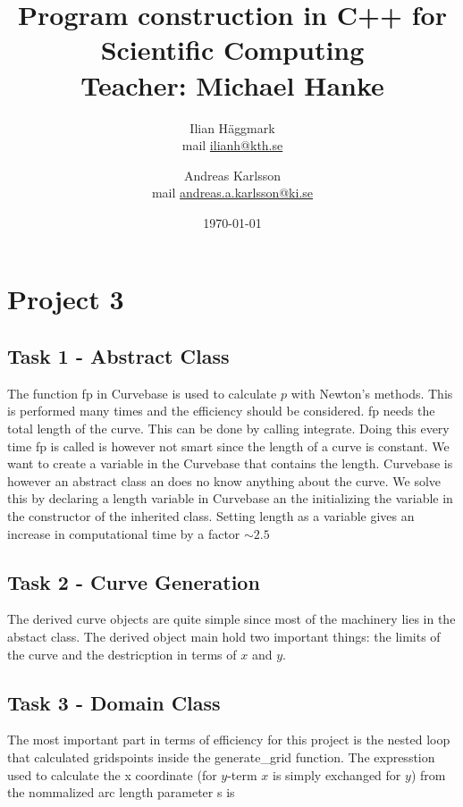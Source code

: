 \documentclass[paper=a4, fontsize=12pt]{article} %
\title{Program construction in C++ for Scientific Computing \\ Teacher: Michael Hanke}
\author{Ilian H{\"a}ggmark \\ mail \href{mailto:ilianh@kth.se}{ilianh@kth.se}
  \and Andreas Karlsson \\ mail \href{mailto:andreas.a.karlsson@ki.se}{andreas.a.karlsson@ki.se} }
\date{\normalsize\today} %
\begin{document}
\maketitle %

\section*{Project 3}
\subsection*{Task 1 - Abstract Class}

The function fp in Curvebase is used to calculate $p$ with Newton's methods. This is performed many times and the efficiency should be considered. fp needs the total length of the curve. This can be done by calling integrate. Doing this every time fp is called is however not smart since the length of a curve is constant. We want to create a variable in the Curvebase that contains the length. Curvebase is however an abstract class an does no know anything about the curve. We solve this by declaring a length variable in Curvebase an the initializing the variable in the constructor of the inherited class. Setting length as a variable gives an increase in computational time by a factor $\sim 2.5$\\



\subsection*{Task 2 - Curve Generation}

The derived curve objects are quite simple since most of the machinery lies in the abstact class. The derived object main hold two important things: the limits of the curve and the destricption in terms of $x$ and $y$.

\subsection*{Task 3 - Domain Class}

The most important part in terms of efficiency for this project is the nested loop that calculated gridspoints inside the generate\_grid function. The expresstion used to calculate the x coordinate (for $y$-term $x$ is simply exchanged for $y$) from the nommalized arc length parameter s is
\end{document}
